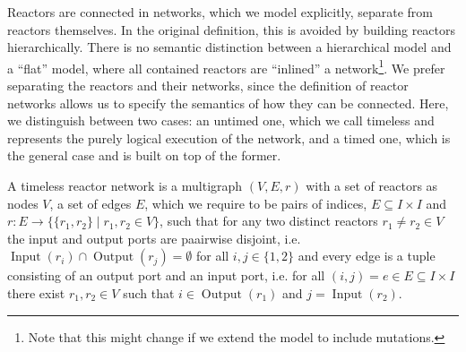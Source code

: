 %

Reactors are connected in networks, which we model explicitly, separate from reactors themselves.
In the original definition, this is avoided by building reactors hierarchically.
There is no semantic distinction between a hierarchical model and a ``flat'' model, where all contained reactors are ``inlined'' a network\footnote{Note
 that this might change if we extend the model to include mutations.}.
We prefer separating the reactors and their networks, since the definition of reactor networks allows us to specify the semantics of how they can be connected.
Here, we distinguish between two cases: an untimed one, which we call timeless and represents the purely logical execution of the network,
and a timed one, which is the general case and is built on top of the former.

\begin{defn}
    \label{defn:timeless_network}
A timeless reactor network is a multigraph $(V,E,r)$ with a set of reactors as nodes $V$,
a set of edges $E$, which we require to be pairs of indices, $E \subseteq I \times I$ and $r : E \rightarrow \{ \{r_1, r_2\} \mid r_1, r_2 \in V \}$,
such that for any two distinct reactors $r_1 \neq r_2 \in V$ the input and output ports are paairwise disjoint,
i.e. $\operatorname{Input}(r_i) \cap \operatorname{Output}(r_j) = \emptyset$ for all $i,j \in \{ 1, 2 \}$ and every edge is a tuple consisting of an output port and an input port,
i.e. for all $(i,j) = e \in E \subseteq I \times I$ there exist $r_1,r_2 \in V$ such that $i \in \operatorname{Output}(r_1)$ and $j = \operatorname{Input}(r_2)$.
\end{defn}


